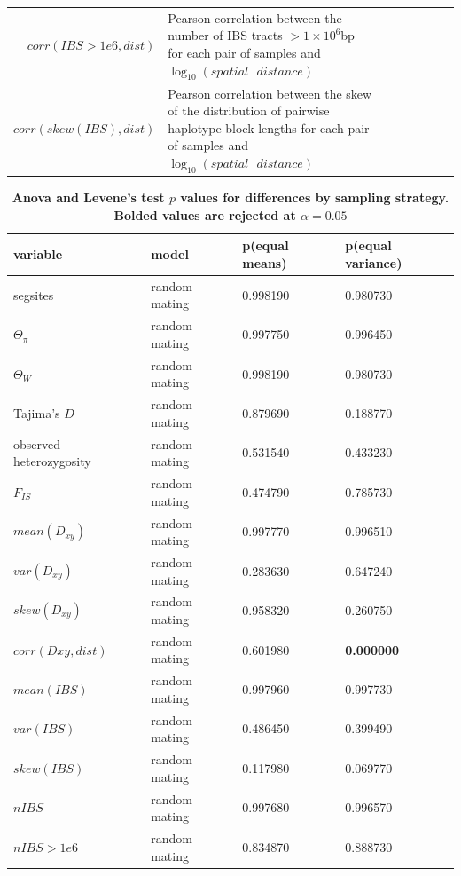 \documentclass[10pt,twoside,lineno,hidelinks]{preprint}
\begin{document}
\begin{table}
\begin{tabular}{rllrrrrr}
$corr(IBS>1e6,dist)$ & \makecell[l]{Pearson correlation between the number of IBS tracts $> 1\times10^6$bp \\for each pair of samples and $\log_{10}(spatial\text{ }distance)$} \\
$corr(skew(IBS),dist)$ & \makecell[l]{Pearson correlation between the skew of the distribution of pairwise haplotype\\ block lengths for each pair of samples and $\log_{10}(spatial\text{ }distance)$} \\
\end{tabular}
\label{table:sumstats}
\end{table}
\FloatBarrier

\begin{table}[htbp]
\tiny
\centering
\caption{\bf Anova and Levene's test $p$ values for differences by sampling strategy. Bolded values are rejected at $\alpha=0.05$}
\begin{tableminipage}{\textwidth}
\begin{tabularx}{\textwidth}{XXXX}
  \hline
 variable & model & p(equal means) & p(equal variance) \\ 
  \hline
segsites & random mating & 0.998190 & 0.980730 \\ 
$\Theta_{\pi}$ & random mating & 0.997750 & 0.996450 \\ 
$\Theta_{W}$ & random mating & 0.998190 & 0.980730 \\ 
Tajima's $D$ & random mating & 0.879690 & 0.188770 \\ 
observed heterozygosity & random mating & 0.531540 & 0.433230 \\ 
$F_{IS}$ & random mating & 0.474790 & 0.785730 \\ 
$mean(D_{xy})$ & random mating & 0.997770 & 0.996510 \\ 
$var(D_{xy})$ & random mating & 0.283630 & 0.647240 \\ 
$skew(D_{xy})$ & random mating & 0.958320 & 0.260750 \\ 
$corr(Dxy,dist)$ & random mating & 0.601980 &\textbf{0.000000} \\ 
$mean(IBS)$ & random mating & 0.997960 & 0.997730 \\ 
$var(IBS)$ & random mating & 0.486450 & 0.399490 \\ 
$skew(IBS)$ & random mating & 0.117980 & 0.069770 \\ 
$nIBS$ & random mating & 0.997680 & 0.996570 \\ 
$nIBS>1e6$ & random mating & 0.834870 & 0.888730 \\ 

\end{tabularx}
\end{tableminipage}
\end{table}
\end{document}
